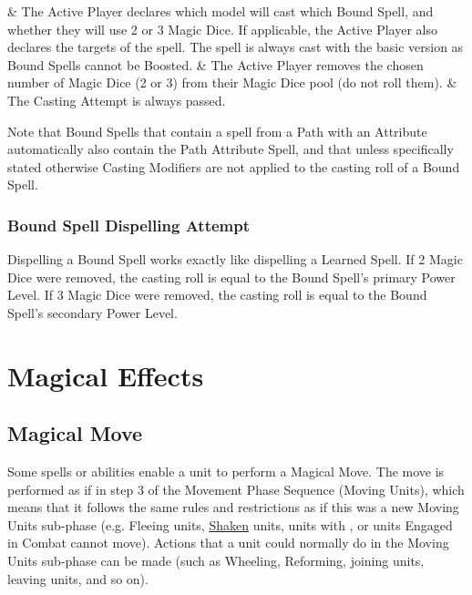  & The Active Player declares which model will cast which Bound Spell, and whether they will use 2 or 3 Magic Dice. If applicable, the Active Player also declares the targets of the spell. The spell is always cast with the basic version as Bound Spells cannot be Boosted.  & The Active Player removes the chosen number of Magic Dice (2 or 3) from their Magic Dice pool (do not roll them).  & The Casting Attempt is always passed.
\closeseqtablemc

Note that Bound Spells that contain a spell from a Path with an Attribute automatically also contain the Path Attribute Spell, and that unless specifically stated otherwise Casting Modifiers are not applied to the casting roll of a Bound Spell.

\subsubsection{Bound Spell Dispelling Attempt}

Dispelling a Bound Spell works exactly like dispelling a Learned Spell. If 2 Magic Dice were removed, the casting roll is equal to the Bound Spell's primary Power Level. If 3 Magic Dice were removed, the casting roll is equal to the Bound Spell's secondary Power Level.

\columnbreak

\section{Magical Effects}

\subsection{Magical Move}
\label{magical_move}

Some spells or abilities enable a unit to perform a Magical Move. The move is performed as if in step 3 of the Movement Phase Sequence (Moving Units), which means that it follows the same rules and restrictions as if this was a new Moving Units sub-phase (e.g. Fleeing units, \hyperref[shaken]{Shaken} units, units with \hyperref[random_movement]{\randommovement{}}, or units Engaged in Combat cannot move). Actions that a unit could normally do in the Moving Units sub-phase can be made (such as Wheeling, Reforming, joining units, leaving units, and so on).

